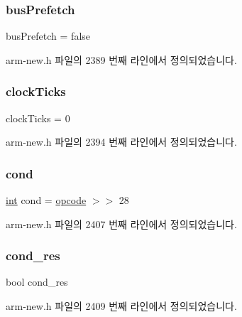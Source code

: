 \subsubsection{\texorpdfstring{bus\+Prefetch}{busPrefetch}}
{\footnotesize\ttfamily bus\+Prefetch = false}



arm-\/new.\+h 파일의 2389 번째 라인에서 정의되었습니다.

\mbox{\label{arm-new_8h_a5810adc3187a4a31cbf4224c12414fb3}} 
\subsubsection{\texorpdfstring{clock\+Ticks}{clockTicks}}
{\footnotesize\ttfamily clock\+Ticks = 0}



arm-\/new.\+h 파일의 2394 번째 라인에서 정의되었습니다.

\mbox{\label{arm-new_8h_a33a0b4d4eea3603435124a4255231922}} 
\subsubsection{\texorpdfstring{cond}{cond}}
{\footnotesize\ttfamily \mbox{\hyperlink{_util_8cpp_a0ef32aa8672df19503a49fab2d0c8071}{int}} cond = \mbox{\hyperlink{thumb_8h_a4fc220098f4b9d0e039a28274d05c198}{opcode}} $>$$>$ 28}



arm-\/new.\+h 파일의 2407 번째 라인에서 정의되었습니다.

\mbox{\label{arm-new_8h_ae931ce7d834148867ceeb444446afb40}} 
\subsubsection{\texorpdfstring{cond\+\_\+res}{cond\_res}}
{\footnotesize\ttfamily bool cond\+\_\+res}



arm-\/new.\+h 파일의 2409 번째 라인에서 정의되었습니다.

